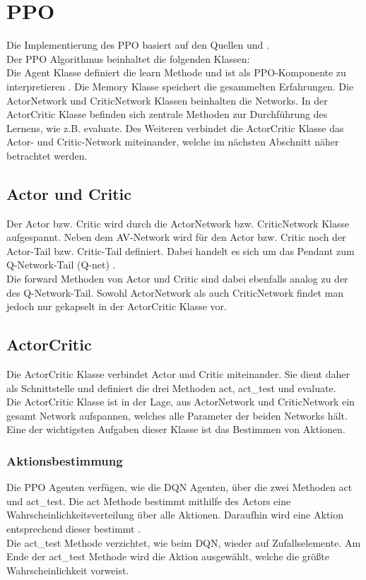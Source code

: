 \section{PPO} \label{sec:Implementierung_PPO}
Die Implementierung des PPO basiert auf den Quellen \cite{pytorch_minimal_ppo} und \cite{Charles2013}.\\
Der PPO Algorithmus beinhaltet die folgenden Klassen:\\
Die Agent Klasse definiert die learn Methode und ist als PPO-Komponente zu interpretieren .
Die Memory Klasse speichert die gesammelten Erfahrungen.
Die ActorNetwork und CriticNetwork Klassen beinhalten die Networks.
In der ActorCritic Klasse befinden sich zentrale Methoden zur Durchführung des Lernens, wie z.B. evaluate. 
Des Weiteren verbindet die ActorCritic Klasse das Actor- und Critic-Network miteinander, welche im nächsten Abschnitt näher betrachtet werden.

\subsection{Actor und Critic} \label{subsec:Implementierung_Actor_und_Critic}
Der Actor bzw. Critic wird durch die ActorNetwork bzw. CriticNetwork Klasse aufgespannt.
Neben dem AV-Network wird für den Actor bzw. Critic noch der Actor-Tail bzw. Critic-Tail definiert. Dabei handelt es sich um das Pendant zum Q-Network-Tail (Q-net) .\\
Die forward Methoden von Actor und Critic sind dabei ebenfalls analog zu der des Q-Network-Tail. 
Sowohl ActorNetwork als auch CriticNetwork findet man jedoch nur gekapselt in der ActorCritic Klasse vor.

\subsection{ActorCritic} \label{subsec:Implementierung_ActorCritic}
Die ActorCritic Klasse verbindet Actor und Critic miteinander. Sie dient daher als Schnittstelle und definiert die drei Methoden act, act\_test und evaluate.\\
Die ActorCritic Klasse ist in der Lage, aus ActorNetwork und CriticNetwork ein gesamt Network aufspannen, welches alle Parameter der beiden Networks hält. Eine der wichtigsten Aufgaben dieser Klasse ist das Bestimmen von Aktionen.

\subsubsection{Aktionsbestimmung} \label{subsubsec:Implementierung_Aktionsbestimmung_PPO}
Die PPO Agenten verfügen, wie die DQN Agenten, über die zwei Methoden act und act\_test. Die act Methode bestimmt mithilfe des Actors eine Wahrscheinlichkeitsverteilung über alle Aktionen.
Daraufhin wird eine Aktion entsprechend dieser bestimmt .\\
Die act\_test Methode verzichtet, wie beim DQN, wieder auf Zufallselemente.
Am Ende der act\_test Methode wird die Aktion ausgewählt, welche die größte Wahrscheinlichkeit vorweist.

